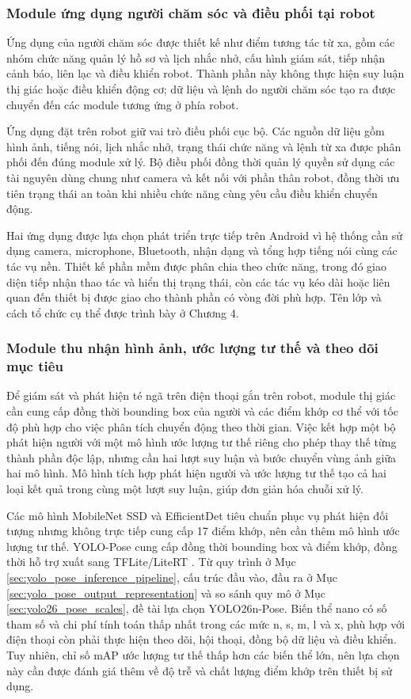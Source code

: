 \subsubsection{Module ứng dụng người chăm sóc và điều phối tại robot}

Ứng dụng của người chăm sóc được thiết kế như điểm tương tác từ xa, gồm các nhóm chức năng quản lý hồ sơ và lịch nhắc nhở, cấu hình giám sát, tiếp nhận cảnh báo, liên lạc và điều khiển robot. Thành phần này không thực hiện suy luận thị giác hoặc điều khiển động cơ; dữ liệu và lệnh do người chăm sóc tạo ra được chuyển đến các module tương ứng ở phía robot.

Ứng dụng đặt trên robot giữ vai trò điều phối cục bộ. Các nguồn dữ liệu gồm hình ảnh, tiếng nói, lịch nhắc nhở, trạng thái chức năng và lệnh từ xa được phân phối đến đúng module xử lý. Bộ điều phối đồng thời quản lý quyền sử dụng các tài nguyên dùng chung như camera và kết nối với phần thân robot, đồng thời ưu tiên trạng thái an toàn khi nhiều chức năng cùng yêu cầu điều khiển chuyển động.

Hai ứng dụng được lựa chọn phát triển trực tiếp trên Android vì hệ thống cần sử dụng camera, microphone, Bluetooth, nhận dạng và tổng hợp tiếng nói cùng các tác vụ nền. Thiết kế phần mềm được phân chia theo chức năng, trong đó giao diện tiếp nhận thao tác và hiển thị trạng thái, còn các tác vụ kéo dài hoặc liên quan đến thiết bị được giao cho thành phần có vòng đời phù hợp. Tên lớp và cách tổ chức cụ thể được trình bày ở Chương 4.

\subsubsection{Module thu nhận hình ảnh, ước lượng tư thế và theo dõi mục tiêu}

Để giám sát và phát hiện té ngã trên điện thoại gắn trên robot, module thị giác cần cung cấp đồng thời bounding box của người và các điểm khớp cơ thể với tốc độ phù hợp cho việc phân tích chuyển động theo thời gian. Việc kết hợp một bộ phát hiện người với một mô hình ước lượng tư thế riêng cho phép thay thế từng thành phần độc lập, nhưng cần hai lượt suy luận và bước chuyển vùng ảnh giữa hai mô hình. Mô hình tích hợp phát hiện người và ước lượng tư thế tạo cả hai loại kết quả trong cùng một lượt suy luận, giúp đơn giản hóa chuỗi xử lý.

Các mô hình MobileNet SSD và EfficientDet tiêu chuẩn phục vụ phát hiện đối tượng nhưng không trực tiếp cung cấp 17 điểm khớp, nên cần thêm mô hình ước lượng tư thế. YOLO-Pose cung cấp đồng thời bounding box và điểm khớp, đồng thời hỗ trợ xuất sang TFLite/LiteRT . Từ quy trình ở Mục \ref{sec:yolo_pose_inference_pipeline}, cấu trúc đầu vào, đầu ra ở Mục \ref{sec:yolo_pose_output_representation} và so sánh quy mô ở Mục \ref{sec:yolo26_pose_scales}, đề tài lựa chọn YOLO26n-Pose. Biến thể nano có số tham số và chi phí tính toán thấp nhất trong các mức n, s, m, l và x, phù hợp với điện thoại còn phải thực hiện theo dõi, hội thoại, đồng bộ dữ liệu và điều khiển. Tuy nhiên, chỉ số mAP ước lượng tư thế thấp hơn các biến thể lớn, nên lựa chọn này cần được đánh giá thêm về độ trễ và chất lượng điểm khớp trên thiết bị sử dụng.

